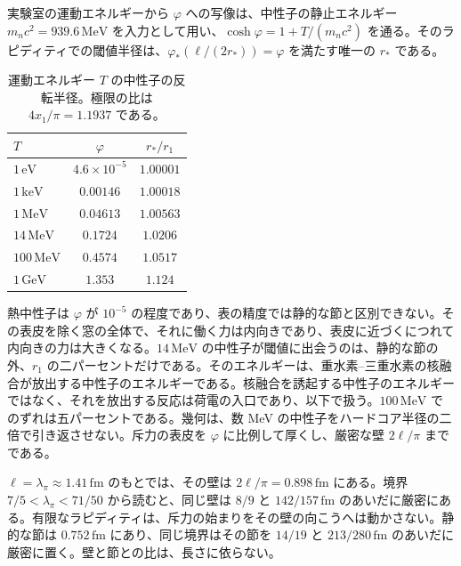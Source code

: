 \documentclass[a4paper]{article}
\begin{document}
実験室の運動エネルギーから \(\varphi\) への写像は、中性子の静止エネルギー \(m_n c^{2}=939.6\,\mathrm{MeV}\) を入力として用い、\(\cosh\varphi=1+T/(m_n c^{2})\) を通る。そのラピディティでの閾値半径は、\(\varphi_*(\ell/(2r_*))=\varphi\) を満たす唯一の \(r_*\) である。

\begin{table}[htbp]
\centering
\caption{運動エネルギー \(T\) の中性子の反転半径。極限の比は \(4x_1/\pi=1.1937\) である。}
\label{tab:neutron}
\begin{tabular}{lcc}
\hline
\(T\) & \(\varphi\) & \(r_*/r_1\) \\
\hline
\(1\,\mathrm{eV}\) & \(4.6\times 10^{-5}\) & \(1.00001\) \\
\(1\,\mathrm{keV}\) & \(0.00146\) & \(1.00018\) \\
\(1\,\mathrm{MeV}\) & \(0.04613\) & \(1.00563\) \\
\(14\,\mathrm{MeV}\) & \(0.1724\) & \(1.0206\) \\
\(100\,\mathrm{MeV}\) & \(0.4574\) & \(1.0517\) \\
\(1\,\mathrm{GeV}\) & \(1.353\) & \(1.124\) \\
\hline
\end{tabular}
\end{table}

熱中性子は \(\varphi\) が \(10^{-5}\) の程度であり、表の精度では静的な節と区別できない。その表皮を除く窓の全体で、それに働く力は内向きであり、表皮に近づくにつれて内向きの力は大きくなる。\(14\,\mathrm{MeV}\) の中性子が閾値に出会うのは、静的な節の外、\(r_1\) の二パーセントだけである。そのエネルギーは、重水素--三重水素の核融合が放出する中性子のエネルギーである。核融合を誘起する中性子のエネルギーではなく、それを放出する反応は荷電の入口であり、以下で扱う。\(100\,\mathrm{MeV}\) でのずれは五パーセントである。幾何は、数 MeV の中性子をハードコア半径の二倍で引き返させない。斥力の表皮を \(\varphi\) に比例して厚くし、厳密な壁 \(2\ell/\pi\) までである。

\(\ell=\lambda_\pi\approx 1.41\,\mathrm{fm}\) のもとでは、その壁は \(2\ell/\pi=0.898\,\mathrm{fm}\) にある。境界 \(7/5<\lambda_\pi<71/50\) から読むと、同じ壁は \(8/9\) と \(142/157\,\mathrm{fm}\) のあいだに厳密にある。有限なラピディティは、斥力の始まりをその壁の向こうへは動かさない。静的な節は \(0.752\,\mathrm{fm}\) にあり、同じ境界はその節を \(14/19\) と \(213/280\,\mathrm{fm}\) のあいだに厳密に置く。壁と節との比は、長さに依らない。
\end{document}
